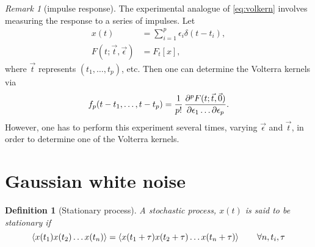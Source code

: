 \documentclass[12pt]{article}
\theoremstyle{slplain}
\theoremstyle{sldefinition}
\newtheorem{defn}{Definition}
\theoremstyle{remark}
\newtheorem*{rem}{Remark}
\begin{document}
\begin{rem}[impulse response]
  The experimental analogue of \eqref{eq:volkern} involves measuring the response to a series of impulses. Let
  \begin{equation}\label{eq:imulses}
  \begin{aligned}
    x(t) &= \sum_{i=1}^p \epsilon_i \delta(t-t_i), \\
    F(t;\vec{t},\vec{\epsilon} ) &= F_t[x],
  \end{aligned}
  \end{equation}
  where $\vec{t}$ represents $(t_1,\ldots,t_p)$, etc. Then one can determine the Volterra kernels via
  \begin{equation}\label{eq:impkern}
    f_p(t-t_1,\ldots,t-t_p) = \frac{1}{p!}\, \frac{\partial^p F(t;\vec{t},\vec{0})}{\partial\epsilon_1\ldots\partial\epsilon_p}.
  \end{equation}
  However, one has to perform this experiment several times, varying $\vec{\epsilon}$ and $\vec{t}$, in order to determine one of the Volterra kernels.
\end{rem}


\section{Gaussian white noise}\label{sec:whitenoise}

\begin{defn}[Stationary process]
  A stochastic process, $x(t)$ is said to be stationary if
  \begin{equation}\label{eq:statproc}
    \left\langle x(t_1)x(t_2) \ldots x(t_n) \right\rangle = \left\langle x(t_1+\tau)x(t_2+\tau) \ldots x(t_n+\tau) \right\rangle
    \qquad \forall n,t_i,\tau
  \end{equation}
\end{defn}
\end{document}
